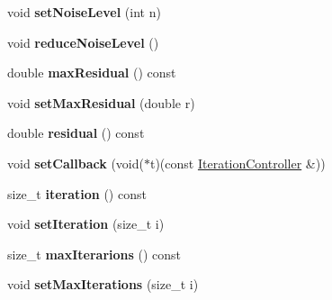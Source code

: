 \begin{DoxyCompactItemize}
void {\bfseries set\+Noise\+Level} (int n)
\item 
\mbox{\label{class_eigen_1_1_iteration_controller_a71470e89f1175fb5d0dbe13ba5a46656}} 
void {\bfseries reduce\+Noise\+Level} ()
\item 
\mbox{\label{class_eigen_1_1_iteration_controller_a4ef521c21a33a7f20213e690868f5dc8}} 
double {\bfseries max\+Residual} () const
\item 
\mbox{\label{class_eigen_1_1_iteration_controller_acba21ed80db5610a9a1f69dbd04a1c40}} 
void {\bfseries set\+Max\+Residual} (double r)
\item 
\mbox{\label{class_eigen_1_1_iteration_controller_af739b1bda26910c6fc19757832aff0f3}} 
double {\bfseries residual} () const
\item 
\mbox{\label{class_eigen_1_1_iteration_controller_a030a9ba60a60d970469bc21b0d687933}} 
void {\bfseries set\+Callback} (void($\ast$t)(const \hyperlink{class_eigen_1_1_iteration_controller}{Iteration\+Controller} \&))
\item 
\mbox{\label{class_eigen_1_1_iteration_controller_acc4ebc37c510ec0ba70af27ce9e51bb5}} 
size\+\_\+t {\bfseries iteration} () const
\item 
\mbox{\label{class_eigen_1_1_iteration_controller_accf6eba315d00a2db827c2fab2521dad}} 
void {\bfseries set\+Iteration} (size\+\_\+t i)
\item 
\mbox{\label{class_eigen_1_1_iteration_controller_a49c76e40ccfcf053e6be148abc8d27b4}} 
size\+\_\+t {\bfseries max\+Iterarions} () const
\item 
\mbox{\label{class_eigen_1_1_iteration_controller_ae9c85f641e476a3d0b7a8fc0befd3dee}} 
void {\bfseries set\+Max\+Iterations} (size\+\_\+t i)
\item 
\mbox{\label{class_eigen_1_1_iteration_controller_a1f61aa20c957a8f4a8a1f9d2d79c4b09}} 

\end{DoxyCompactItemize}
